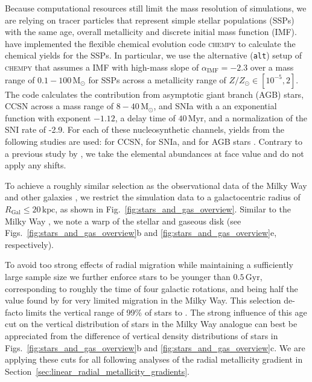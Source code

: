 \documentclass[fleqn,usenatbib]{mnras}
\newcommand{\nihaoAGEmax}{$0.5\,\mathrm{Gyr}$}
\begin{document}
Because computational resources still limit the mass resolution of simulations, we are relying on tracer particles that represent simple stellar populations (SSPs) with the same age, overall metallicity and discrete initial mass function (IMF). \citet{Buck2021} have implemented the flexible chemical evolution code \textsc{chempy} \citep{Rybizki2017} to calculate the chemical yields for the SSPs. In particular, we use the alternative (\texttt{alt}) setup of \textsc{chempy} that assumes a \citet{Chabrier2003} IMF with high-mass slope of $\alpha_\text{IMF} = -2.3$ over a mass range of $0.1-100\,\mathrm{M_\odot}$ for SSPs across a metallicity range of $Z/Z_\odot \in [10^{-5},2]$. The code calculates the contribution from asymptotic giant branch (AGB) stars, CCSN across a mass range of $8-40\,\mathrm{M_\odot}$, and SNIa with a an exponential function with exponent $-1.12$, a delay time of $40\,\mathrm{Myr}$, and a normalization of the SNI rate of -2.9. For each of these nucleosynthetic channels, yields from the following studies are used: \citet{Chieffi2004} for CCSN, \citet{Seitenzahl2013} for SNIa, and \citet{Karakas2016} for AGB stars \citep[\texttt{new\_fit} model in][]{Buck2021}. Contrary to a previous study by \citet{Buder2024}, we take the elemental abundances at face value and do not apply any shifts.

To achieve a roughly similar selection as the observational data of the Milky Way \citep{Genovali2014} and other galaxies \citep[e.g.][]{Chen2023}, we restrict the simulation data to a galactocentric radius of $R_\mathrm{Gal} \leq 20\,\mathrm{kpc}$, as shown in Fig.~\ref{fig:stars_and_gas_overview}. Similar to the Milky Way \citep{Poggio2018, Lemasle2022}, we note a warp of the stellar and gaseous disk (see Figs.~\ref{fig:stars_and_gas_overview}b and \ref{fig:stars_and_gas_overview}e, respectively).

To avoid too strong effects of radial migration \citep{Binney2008, Frankel2018, Grand2016, Minchev2018} while maintaining a sufficiently large sample size we further enforce stars to be younger than \nihaoAGEmax, corresponding to roughly the time of four galactic rotations, and being half the value found by \citet{Minchev2018} for very limited migration in the Milky Way. This selection de-facto limits the vertical range of 99\% of stars to . The strong influence of this age cut on the vertical distribution of stars in the Milky Way analogue can best be appreciated from the difference of vertical density distributions of stars in Figs.~\ref{fig:stars_and_gas_overview}b and \ref{fig:stars_and_gas_overview}c. We are applying these cuts for all following analyses of the radial metallicity gradient in Section~\ref{sec:linear_radial_metallicity_gradients}.
\end{document}
